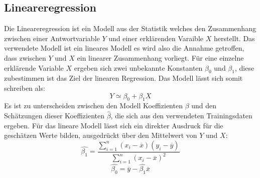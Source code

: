 \subsection{Lineareregression}
Die Lineareregression ist ein Modell aus der Statistik welches den Zusammenhang zwischen einer Antwortvariable \(Y\) und einer erklärenden Varaible \(X\) herstellt. Das verwendete Modell ist ein lineares Modell es wird also die Annahme getroffen, dass zwischen \(Y\) und \(X\) ein linearer Zusammenhang vorliegt. Für eine einzelne erklärende Variable \(X\) ergeben sich zwei unbekannte Konstanten \(\beta_0\) und \(\beta_1\), diese zubestimmen ist das Ziel der linearen Regression. Das Modell lässt sich somit schreiben als:
\begin{equation}
    Y \simeq \beta_0 + \beta_1 X
    \label{eq:linreg1}
\end{equation}
Es ist zu unterscheiden zwischen den Modell Koeffizienten \(\beta\) und den Schätzungen dieser Koeffizienten \(\hat{\beta}\), die sich aus den verwendeten Trainingsdaten ergeben. 
Für das lineare Modell lässt sich ein direkter Ausdruck für die geschätzen Werte bilden, ausgedrückt über den Mittelwert von \(Y\) und \(X\):
\begin{equation}
    \hat{\beta_1} = \frac{\sum_{i=1}^{n}(x_i - \overline{x})(y_i - \overline{y})}{\sum_{i=1}^{n}(x_i - \overline{x})^2}
\end{equation}
\begin{equation}
    \hat{\beta_0} = \overline{y} - \hat{\beta_1}\overline{x}
\end{equation}

\cite{james2013}



